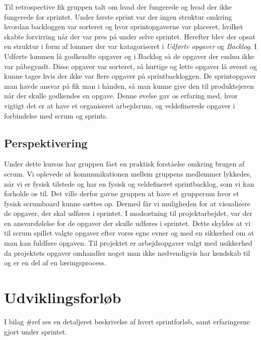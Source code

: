 Til retrospective fik gruppen talt om hvad der fungerede og hvad der ikke fungerede for sprintet. Under første sprint var der ingen struktur omkring hvordan backloggen var sorteret og hvor sprintopgaverne var placeret, hvilket skabte forvirring når der var pres på under selve sprintet. Herefter blev der opsat en struktur i form af lommer der var katagoriseret i \textit{Udførte opgaver} og \textit{Backlog}. I Udførte lommen lå godkendte opgaver og i Backlog så de opgaver der endnu ikke var påbegyndt. Disse opgaver var sorteret, så hurtige og lette opgaver lå øverst og kunne tages hvis der ikke var flere opgaver på sprintbackloggen. De sprintopgaver man havde ansvar på fik man i hånden, så man kunne give den til produktejeren når der skulle godkendes en opgave. \newline
Denne øvelse gav os erfaring med, hvor vigtigt det er at have et organiseret arbejdsrum, og veldefinerede opgaver i forbindelse med scrum og sprints.

\section{Perspektivering}
Under dette kursus har gruppen fået en praktisk forståelse omkring brugen af scrum. Vi oplevede at kommunikationen mellem gruppens medlemmer lykkedes, når vi er fysisk tilstede og har en fysisk og veldefineret sprintbacklog, som vi kan forholde os til. Det ville derfor gavne gruppen at have et grupperum hvor et fysisk scrumboard kunne sættes op. Dermed får vi muligheden for at visualisere de opgaver, der skal udføres i sprintet. \newline
I modsætning til projektarbejdet, var der en ansvarsfølelse for de opgaver der skulle udføres i sprintet. Dette skyldes at vi til scrum spillet valgte opgaver efter vores egne evner og med en sikkerhed om at man kan fuldføre opgaven. Til projektet er arbejdsopgaver valgt med usikkerhed da projektets opgaver omhandler noget man ikke nødvendigvis har kendskab til og er en del af en læringsprocess.

\chapter{Udviklingsforløb}
I bilag \#ref ses en detaljeret beskrivelse af hvert sprintforløb, samt erfaringerne gjort under sprintet.


